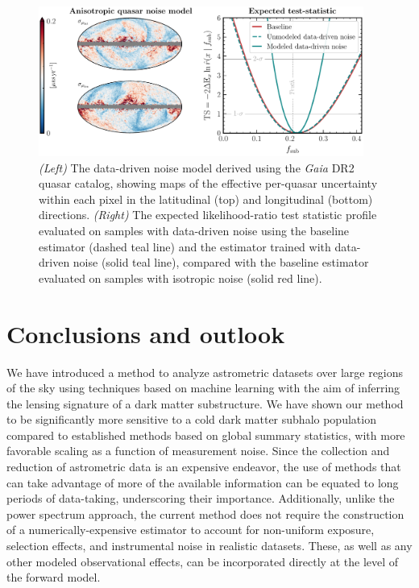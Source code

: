 \documentclass[twocolumn]{aastex631}
\begin{document}
\begin{figure}[!htbp]
\centering
\includegraphics[width=0.95\textwidth]{anisotropic_noise}
\caption{{\emph{(Left)} The data-driven noise model derived using the \emph{Gaia} DR2 quasar catalog, showing maps of the effective per-quasar uncertainty within each pixel in the latitudinal (top) and longitudinal (bottom) directions. \emph{(Right)} The expected likelihood-ratio test statistic profile evaluated on samples with data-driven noise using the baseline estimator (dashed teal line) and the estimator trained with data-driven noise (solid teal line), compared with the baseline estimator evaluated on samples with isotropic noise (solid red line).}}
\label{fig:anisotropic_noise}
\end{figure}
    
\section{Conclusions and outlook}
\label{sec:conclusions}

We have introduced a method to analyze astrometric datasets over large regions of the sky using techniques based on machine learning with the aim of inferring the lensing signature of a dark matter substructure. We have shown our method to be significantly more sensitive to a cold dark matter subhalo population compared to established methods based on global summary statistics, with more favorable scaling as a function of measurement noise. Since the collection and reduction of astrometric data is an expensive endeavor, the use of methods that can take advantage of more of the available information can be equated to long periods of data-taking, underscoring their importance. Additionally, unlike the power spectrum approach, the current method does not require the construction of a numerically-expensive estimator to account for non-uniform exposure, selection effects, and instrumental noise in realistic datasets. These, as well as any other modeled observational effects, can be incorporated directly at the level of the forward model. 
\end{document}
